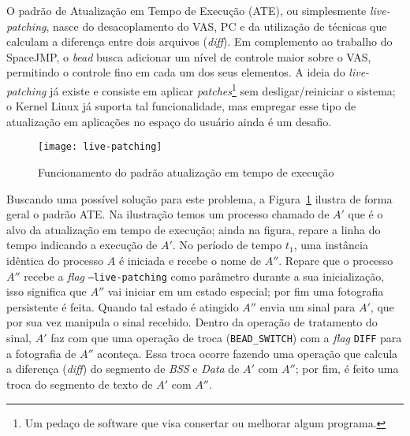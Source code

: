 O padrão de Atualização em Tempo de Execução (ATE), ou simplesmente
\emph{live-patching}, nasce do desacoplamento do VAS, PC e da utilização de
técnicas que calculam a diferença entre dois arquivos (\emph{diff}). Em
complemento ao trabalho do SpaceJMP, o \emph{bead} busca adicionar um nível de
controle maior sobre o VAS, permitindo o controle fino em cada um dos seus
elementos. A ideia do \emph{live-patching} já existe e consiste em aplicar
\emph{patches}\footnote{Um pedaço de software que visa consertar ou melhorar
algum programa.} sem desligar/reiniciar o sistema; o Kernel Linux já suporta
tal funcionalidade, mas empregar esse tipo de atualização em aplicações no
espaço do usuário ainda é um desafio.

\begin{figure}[!h]
  \centering
  \texttt{[image: live-patching]}
  \caption{Funcionamento do padrão atualização em tempo de execução}
  \label{fig:atr}
\end{figure}

Buscando uma possível solução para este problema, a Figura~\ref{fig:atr}
ilustra de forma geral o padrão ATE. Na ilustração temos um processo chamado de
$A'$ que é o alvo da atualização em tempo de execução; ainda na figura, repare a linha
do tempo indicando a execução de $A'$. No período de tempo $t_1$, uma instância
idêntica do processo $A$ é iniciada e recebe o nome de $A''$.  Repare que o
processo $A''$ recebe a \emph{flag} \texttt{--live-patching} como parâmetro
durante a sua inicialização, isso significa que $A''$ vai iniciar em um estado
especial; por fim uma fotografia persistente é feita. Quando tal estado é
atingido $A''$ envia um sinal para $A'$, que por sua vez manipula o sinal
recebido.  Dentro da operação de tratamento do sinal, $A'$ faz com que uma
operação de troca (\texttt{BEAD\_SWITCH}) com a \emph{flag} \texttt{DIFF} para
a fotografia de $A''$ aconteça. Essa troca ocorre fazendo uma operação que
calcula a diferença (\emph{diff}) do segmento de \emph{BSS} e \emph{Data} de
$A'$ com $A''$; por fim, é feito uma troca do segmento de texto de $A'$ com
$A''$.



